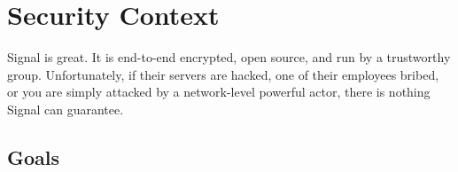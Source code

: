 \section{Security Context}
\label{sec:securitycontext}


Signal is great. It is end-to-end encrypted, open source, and run by a trustworthy group. Unfortunately, if their servers are hacked, one of their employees bribed, or you are simply attacked by a network-level powerful actor, there is nothing Signal can guarantee.

\subsection{Goals}

